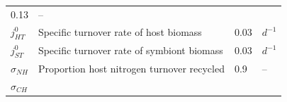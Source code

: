 \documentclass[]{elsarticle} %
\begin{document}
\begin{longtable}[c]{@{}llll@{}}
\begin{minipage}[t]{0.09\columnwidth}
0.13
\strut\end{minipage} &
\begin{minipage}[t]{0.23\columnwidth}\raggedright\strut
--
\strut\end{minipage}\tabularnewline
\begin{minipage}[t]{0.10\columnwidth}\raggedright\strut
\(j_{HT}^0\)
\strut\end{minipage} &
\begin{minipage}[t]{0.48\columnwidth}\raggedright\strut
Specific turnover rate of host biomass
\strut\end{minipage} &
\begin{minipage}[t]{0.09\columnwidth}\raggedright\strut
0.03
\strut\end{minipage} &
\begin{minipage}[t]{0.23\columnwidth}\raggedright\strut
\(d^{-1}\)
\strut\end{minipage}\tabularnewline
\begin{minipage}[t]{0.10\columnwidth}\raggedright\strut
\(j_{ST}^0\)
\strut\end{minipage} &
\begin{minipage}[t]{0.48\columnwidth}\raggedright\strut
Specific turnover rate of symbiont biomass
\strut\end{minipage} &
\begin{minipage}[t]{0.09\columnwidth}\raggedright\strut
0.03
\strut\end{minipage} &
\begin{minipage}[t]{0.23\columnwidth}\raggedright\strut
\(d^{-1}\)
\strut\end{minipage}\tabularnewline
\begin{minipage}[t]{0.10\columnwidth}\raggedright\strut
\(\sigma_{NH}\)
\strut\end{minipage} &
\begin{minipage}[t]{0.48\columnwidth}\raggedright\strut
Proportion host nitrogen turnover recycled
\strut\end{minipage} &
\begin{minipage}[t]{0.09\columnwidth}\raggedright\strut
0.9
\strut\end{minipage} &
\begin{minipage}[t]{0.23\columnwidth}\raggedright\strut
--
\strut\end{minipage}\tabularnewline
\begin{minipage}[t]{0.10\columnwidth}\raggedright\strut
\(\sigma_{CH}\)
\strut\end{minipage} &
\begin{minipage}[t]{0.48\columnwidth}\raggedright\strut

\end{minipage}
\end{longtable}
\end{document}
